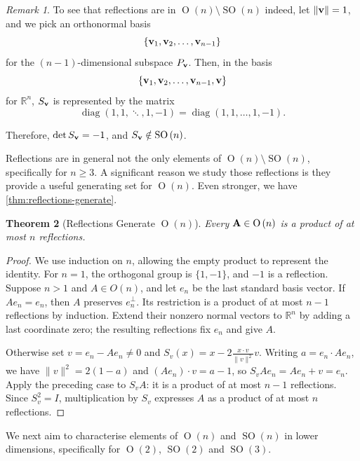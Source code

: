 \documentclass{article}
\newtheorem{theorem}{Theorem}[section]
\theoremstyle{definition}
\theoremstyle{remark}
\newtheorem{remark}[theorem]{Remark}
\newcommand{\pqty}[1]{\left(#1\right)}
\newcommand{\Bqty}[1]{\left\{#1\right\}}
\newcommand{\RR}{\mathbb{R}}
\newcommand{\diag}{\operatorname{diag}}
\DeclarePairedDelimiter{\norm}{\lVert}{\rVert}
\newcommand{\SO}{\operatorname{SO}}
\newcommand{\Or}{\operatorname{O}}
\begin{document}
\begin{remark}
    To see that reflections are in \(\Or\pqty{n} \setminus \SO\pqty{n}\) indeed, let \(\norm{\vb{v}} = 1\), and we pick an orthonormal basis
    \[
        \Bqty{\vb{v}_1, \vb{v}_2, \ldots, \vb{v}_{n - 1}}
    \]
    for the \(\pqty{n-1}\)-dimensional subspace \(P_{\vb{v}}\). Then, in the basis
    \[
        \Bqty{\vb{v}_1, \vb{v}_2, \ldots, \vb{v}_{n - 1}, \vb{v}}
    \]
    for \(\RR^n\), \(S_{\vb{v}}\) is represented by the matrix
    \[
        \operatorname{diag}\pqty{1, 1, \ddots, 1, -1} = \diag\pqty{1, 1, \ldots, 1, -1}.
    \]

    Therefore, \(\det S_{\vb{v}} = -1\), and \(S_{\vb{v}} \notin \SO\pqty{n}\).
\end{remark}

Reflections are in general not the only elements of \(\Or\pqty{n} \setminus \SO\pqty{n}\), specifically for \(n \geq 3\). A significant reason we study those reflections is they provide a useful generating set for \(\Or\pqty{n}\). Even stronger, we have \autoref{thm:reflections-generate}.

\begin{theorem}[Reflections Generate \(\Or\pqty{n}\)]
    \label{thm:reflections-generate}%
    Every \(\vb{A} \in \Or\pqty{n}\) is a product of at most \(n\) reflections.
\end{theorem}

\begin{proof}
We use induction on $n$, allowing the empty product to represent the identity.
For $n=1$, the orthogonal group is $\{1,-1\}$, and $-1$ is a reflection.
Suppose $n>1$ and $A\in O(n)$, and let $e_n$ be the last standard basis vector.
If $Ae_n=e_n$, then $A$ preserves $e_n^\perp$. Its restriction is a product of at most $n-1$ reflections by induction. Extend their nonzero normal vectors to $\mathbb R^n$ by adding a last coordinate zero; the resulting reflections fix $e_n$ and give $A$.

Otherwise set $v=e_n-Ae_n\ne0$ and $S_v(x)=x-2\frac{x\cdot v}{\|v\|^2}v$.
Writing $a=e_n\cdot Ae_n$, we have $\|v\|^2=2(1-a)$ and $(Ae_n)\cdot v=a-1$, so $S_vAe_n=Ae_n+v=e_n$.
Apply the preceding case to $S_vA$: it is a product of at most $n-1$ reflections. Since $S_v^2=I$, multiplication by $S_v$ expresses $A$ as a product of at most $n$ reflections.
\end{proof}

We next aim to characterise elements of \(\Or\pqty{n}\) and \(\SO\pqty{n}\) in lower dimensions, specifically for \(\Or\pqty{2}\), \(\SO\pqty{2}\) and \(\SO\pqty{3}\).
\end{document}
